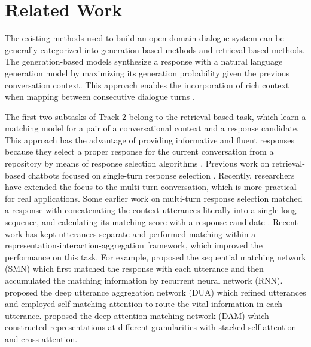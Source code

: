 \documentclass[letterpaper]{article} \usepackage{aaai20}  \usepackage{times}  \usepackage{helvet} \usepackage{courier}  \usepackage[hyphens]{url}  \usepackage{graphicx} \urlstyle{rm} \def\UrlFont{\rm}  \usepackage{graphicx}  \frenchspacing  \setlength{\pdfpagewidth}{8.5in}  \setlength{\pdfpageheight}{11in}
\begin{document}
\section{Related Work}

  The existing methods used to build an open domain dialogue system can be generally categorized into generation-based methods and retrieval-based methods.
  The generation-based models synthesize a response with a natural language generation model by maximizing its generation probability given the previous conversation context.
  This approach enables the incorporation of rich context when mapping between consecutive dialogue turns \cite{DBLP:conf/acl/ShangLL15,DBLP:conf/aaai/SerbanSBCP16}.

  The first two subtasks of Track 2 belong to the retrieval-based task, which learn a matching model for a pair of a conversational context and a response candidate.
  This approach has the advantage of providing informative and fluent responses because they select a proper response for the current conversation from a repository by means of response selection algorithms \cite{DBLP:conf/sigdial/LowePSP15,DBLP:journals/dad/LowePSCLP17,DBLP:conf/acl/WuWXZL17,DBLP:conf/coling/ZhangLZZL18,gu2019utterance}.
  Previous work on retrieval-based chatbots focused on single-turn response selection \cite{DBLP:conf/emnlp/WangLLC13,DBLP:journals/corr/JiLL14}.
  Recently, researchers have extended the focus to the multi-turn conversation, which is more practical for real applications.
  Some earlier work on multi-turn response selection matched a response with concatenating the context utterances literally into a single long sequence, and calculating its matching score with a response candidate \cite{DBLP:conf/sigdial/LowePSP15,DBLP:journals/dad/LowePSCLP17}.
  Recent work has kept utterances separate and performed matching within a representation-interaction-aggregation framework, which improved the performance on this task.
  For example, \cite{DBLP:conf/acl/WuWXZL17} proposed the sequential matching network (SMN) which first matched the response with each utterance and then accumulated the matching information by recurrent neural network (RNN).
  \cite{DBLP:conf/coling/ZhangLZZL18} proposed the deep utterance aggregation network (DUA) which refined utterances and employed self-matching attention to route the vital information in each utterance.
  \cite{DBLP:conf/acl/WuLCZDYZL18} proposed the deep attention matching network (DAM) which constructed representations at different granularities with stacked self-attention and cross-attention.
\end{document}
